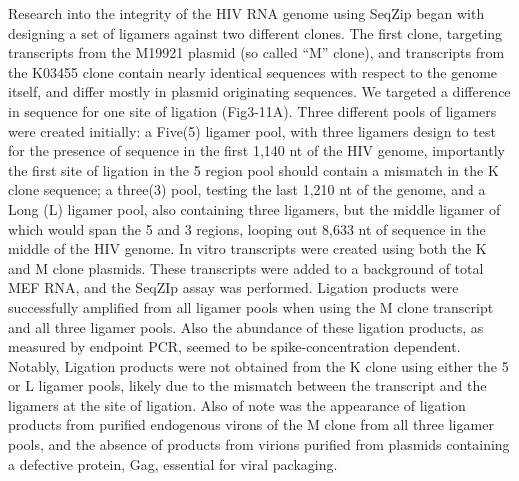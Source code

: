 	  Research into the integrity of the HIV RNA genome using SeqZip began with designing a set of ligamers against two different clones. The first clone, targeting transcripts from the M19921 plasmid (so called ``M'' clone), and transcripts from the K03455 clone contain nearly identical sequences with respect to the genome itself, and differ mostly in plasmid originating sequences. We targeted a difference in sequence for one site of ligation (Fig3-11A). Three different pools of ligamers were created initially: a Five(5) ligamer pool, with three ligamers design to test for the presence of sequence in the first 1,140 nt of the HIV genome, importantly the first site of ligation in the 5 region pool should contain a mismatch in the K clone sequence; a three(3) pool, testing the last 1,210 nt of the genome, and a Long (L) ligamer pool, also containing three ligamers, but the middle ligamer of which would span the 5 and 3 regions, looping out 8,633 nt of sequence in the middle of the HIV genome. In vitro transcripts were created using both the K and M clone plasmids. These transcripts were added to a background of total MEF RNA, and the SeqZIp assay was performed. Ligation products were successfully amplified from all ligamer pools when using the M clone transcript and all three ligamer pools. Also the abundance of these ligation products, as measured by endpoint PCR, seemed to be spike-concentration dependent. Notably, Ligation products were not obtained from the K clone using either the 5 or L ligamer pools, likely due to the mismatch between the transcript and the ligamers at the site of ligation. Also of note was the appearance of ligation products from purified endogenous virons of the M clone from all three ligamer pools, and the absence of products from virions purified from plasmids containing a defective protein, Gag, essential for viral packaging. 

